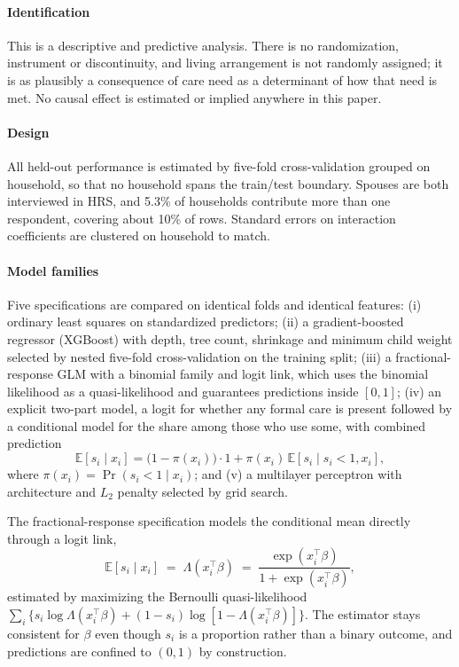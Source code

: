 \documentclass[9pt,twoside]{pnas-new}
\begin{document}
\paragraph{Identification} This is a descriptive and predictive
analysis. There is no randomization, instrument or discontinuity, and living
arrangement is not randomly assigned; it is as plausibly a consequence
of care need as a determinant of how that need is met. No causal effect is
estimated or implied anywhere in this paper.

\paragraph{Design} All held-out performance is estimated by five-fold
cross-validation grouped on household, so that no household spans the
train/test boundary. Spouses are both interviewed in HRS, and 5.3\% of
households contribute more than one respondent, covering about 10\% of rows.
Standard errors on interaction coefficients are clustered on household to match.

\paragraph{Model families} Five specifications are compared on identical folds
and identical features: (i) ordinary least squares on standardized predictors;
(ii) a gradient-boosted regressor (XGBoost) \cite{chen2016} with depth, tree count, shrinkage
and minimum child weight selected by nested five-fold cross-validation on the
training split; (iii) a fractional-response GLM \cite{papke1996} with a binomial family and logit
link, which uses the binomial likelihood as a quasi-likelihood and guarantees
predictions inside $[0,1]$; (iv) an explicit two-part model, a logit for whether
any formal care is present followed by a conditional model for the share among
those who use some, with combined prediction
\begin{equation}
\label{eq:twopart}
\mathbb{E}[s_i \mid x_i] = \bigl(1 - \pi(x_i)\bigr)\cdot 1
                          + \pi(x_i)\,\mathbb{E}[s_i \mid s_i < 1, x_i],
\end{equation}
where $\pi(x_i) = \Pr(s_i < 1 \mid x_i)$; and (v) a multilayer perceptron with
architecture and $L_2$ penalty selected by grid search.

The fractional-response specification models the conditional mean directly
through a logit link,
\begin{equation}
\label{eq:frac}
\mathbb{E}[s_i \mid x_i] \;=\; \Lambda(x_i^{\top}\beta)
\;=\; \frac{\exp(x_i^{\top}\beta)}{1 + \exp(x_i^{\top}\beta)},
\end{equation}
estimated by maximizing the Bernoulli quasi-likelihood
$\sum_i \{s_i \log \Lambda(x_i^{\top}\beta) + (1-s_i)\log[1-\Lambda(x_i^{\top}\beta)]\}$.
The estimator stays consistent for $\beta$ even though $s_i$ is a proportion
rather than a binary outcome, and predictions are confined to $(0,1)$ by
construction.
\end{document}
